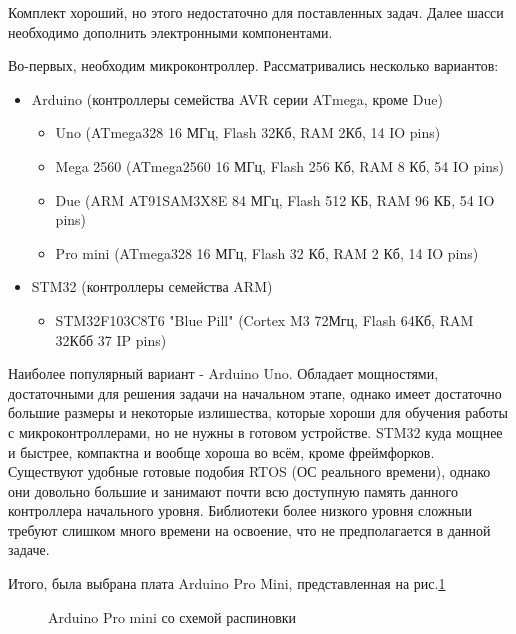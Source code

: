 \documentclass[14pt,a4paper,russian]{scrartcl}
\begin{document}
Комплект хороший, но этого недостаточно для поставленных задач. Далее шасси
необходимо дополнить электронными компонентами. 

Во-первых, необходим микроконтроллер. Рассматривались несколько вариантов:
\begin{itemize}
    \item Arduino (контроллеры семейства AVR серии ATmega, кроме Due)
    \begin{itemize}
        \item Uno (ATmega328 16 МГц, Flash 32Кб, RAM 2Кб, 14 IO pins)
        \item Mega 2560 (ATmega2560 16 МГц, Flash 256 Кб, RAM 8 Кб, 54 IO pins)
        \item Due (ARM AT91SAM3X8E 84 МГц, Flash 512 КБ, RAM 96 КБ, 54 IO pins)
        \item Pro mini (ATmega328 16 МГц, Flash 32 Кб, RAM 2 Кб, 14 IO pins)
    \end{itemize}
    \item STM32 (контроллеры семейства ARM)
    \begin{itemize}
        \item STM32F103C8T6 "Blue Pill" (Cortex M3 72Мгц, Flash 64Кб, RAM 32Кбб 37 IP pins)
    \end{itemize}
\end{itemize}
Наиболее популярный вариант - Arduino Uno. Обладает мощностями, достаточными
для решения задачи на начальном этапе, однако имеет достаточно большие размеры и
некоторые излишества, которые хороши для обучения работы с микроконтроллерами,
но не нужны в готовом устройстве. STM32 куда мощнее и быстрее, компактна
и вообще хороша во всём, кроме фреймфорков. Существуют удобные готовые подобия
RTOS (ОС реального времени), однако они довольно большие и занимают почти всю
доступную память данного контроллера начального уровня. Библиотеки более низкого
уровня сложныи требуют слишком много времени на освоение, что не предполагается
в данной задаче.

Итого, была выбрана плата Arduino Pro Mini, представленная на рис.\ref{fig:pro_mini}
\begin{figure}[h]
    \caption{Arduino Pro mini со схемой распиновки}
    \label{fig:pro_mini}
\end{figure}
\end{document}
